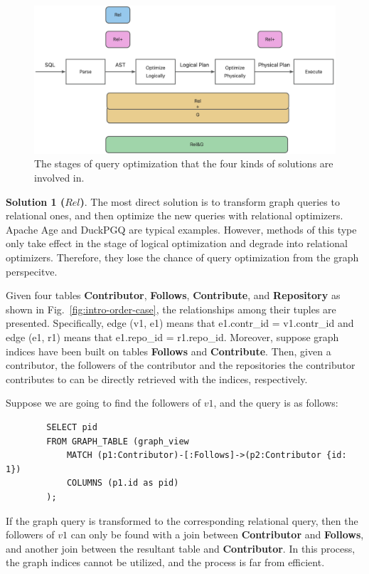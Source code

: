 {\begin{figure}
    \centering
    \includegraphics[width=.6\linewidth]{./figures/catagory.png}
    \caption{The stages of query optimization that the four kinds of solutions are involved in.}
    \label{fig:catagory}
\end{figure}

\textbf{Solution 1 ($Rel$)}.
The most direct solution is to transform graph queries to relational ones, and then optimize the new queries with relational optimizers.
Apache Age \cite{apache-age} and DuckPGQ \cite{DuckPGQ,DuckPGQ-VLDB} are typical examples.
However, methods of this type only take effect in the stage of logical optimization and degrade into relational optimizers.
Therefore, they lose the chance of query optimization from the graph perspecitve.

\begin{example}
    Given four tables \textbf{Contributor}, \textbf{Follows}, \textbf{Contribute}, and \textbf{Repository} as shown in Fig.~\ref{fig:intro-order-case}, the relationships among their tuples are presented.
    Specifically, edge (v1, e1) means that e1.contr\_id = v1.contr\_id and edge (e1, r1) means that e1.repo\_id = r1.repo\_id.
    Moreover, suppose graph indices have been built on tables \textbf{Follows} and \textbf{Contribute}.
    Then, given a contributor, the followers of the contributor and the repositories the contributor contributes to can be directly retrieved with the indices, respectively.

    Suppose we are going to find the followers of $v1$, and the query is as follows:
    \begin{lstlisting}
        SELECT pid
        FROM GRAPH_TABLE (graph_view
            MATCH (p1:Contributor)-[:Follows]->(p2:Contributor {id: 1})
            COLUMNS (p1.id as pid)
        );
    \end{lstlisting}
    If the graph query is transformed to the corresponding relational query, then the followers of $v1$ can only be found with a join between \textbf{Contributor} and \textbf{Follows}, and another join between the resultant table and \textbf{Contributor}.
    In this process, the graph indices cannot be utilized, and the process is far from efficient.
\end{example}


}
